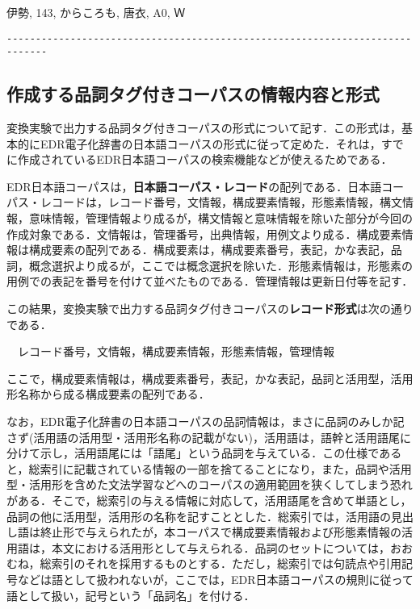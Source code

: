 伊勢, 143, からころも, 唐衣, A0, Ｗ

\vspace{-8pt}\begin{verbatim}
-----------------------------------------------------------------------------
\end{verbatim}\vspace{-8pt}
\subsection{作成する品詞タグ付きコーパスの情報内容と形式}
\label{sec:EDRStyle}
変換実験で出力する品詞タグ付きコーパスの形式について記す．この形式は，基本的にEDR電子化辞書の日本語コーパスの形式\cite{EDR2001}に従って定めた．それは，すでに作成されているEDR日本語コーパスの検索機能などが使えるためである\cite{Oota1997}\cite{EDR1999}\cite{Suzuki1999}．

EDR日本語コーパスは，{\bf 日本語コーパス・レコード}の配列である．日本語コーパス・レコードは，レコード番号，文情報，構成要素情報，形態素情報，構文情報，意味情報，管理情報より成るが，構文情報と意味情報を除いた部分が今回の作成対象である．文情報は，管理番号，出典情報，用例文より成る．構成要素情報は構成要素の配列である．構成要素は，構成要素番号，表記，かな表記，品詞，概念選択より成るが，ここでは概念選択を除いた．形態素情報は，形態素の用例での表記を番号を付けて並べたものである．管理情報は更新日付等を記す．

この結果，変換実験で出力する品詞タグ付きコーパスの{\bf レコード形式}は次の通りである．

　レコード番号，文情報，構成要素情報，形態素情報，管理情報

ここで，構成要素情報は，構成要素番号，表記，かな表記，品詞と活用型，活用形名称から成る構成要素の配列である．

なお，EDR電子化辞書の日本語コーパスの品詞情報は，まさに品詞のみしか記さず(活用語の活用型・活用形名称の記載がない)，活用語は，語幹と活用語尾に分けて示し，活用語尾には「語尾」という品詞を与えている．この仕様であると，総索引に記載されている情報の一部を捨てることになり，また，品詞や活用型・活用形を含めた文法学習などへのコーパスの適用範囲を狭くしてしまう恐れがある．そこで，総索引の与える情報に対応して，活用語尾を含めて単語とし，品詞の他に活用型，活用形の名称を記すこととした．総索引では，活用語の見出し語は終止形で与えられたが，本コーパスで構成要素情報および形態素情報の活用語は，本文における活用形として与えられる．品詞のセットについては，おおむね，総索引のそれを採用するものとする．ただし，総索引では句読点や引用記号などは語として扱われないが，ここでは，EDR日本語コーパスの規則に従って語として扱い，記号という「品詞名」を付ける．

